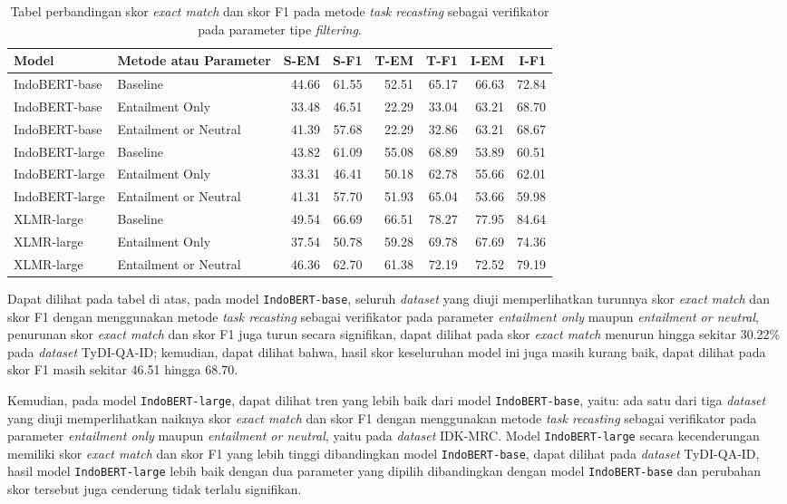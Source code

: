 \begin{table}[H]\centering
\small
\begin{tabular}{llrrrrrr}
\toprule
         Model &                Metode atau Parameter &  S-EM &  S-F1 &  T-EM &  T-F1 &  I-EM &  I-F1 \\
\midrule
 IndoBERT-base &              Baseline & 44.66 & 61.55 & 52.51 & 65.17 & 66.63 & 72.84 \\
 IndoBERT-base &       Entailment Only & 33.48 & 46.51 & 22.29 & 33.04 & 63.21 & 68.70 \\
 IndoBERT-base & Entailment or Neutral & 41.39 & 57.68 & 22.29 & 32.86 & 63.21 & 68.67 \\
\hline
IndoBERT-large &              Baseline & 43.82 & 61.09 & 55.08 & 68.89 & 53.89 & 60.51 \\
IndoBERT-large &       Entailment Only & 33.31 & 46.41 & 50.18 & 62.78 & 55.66 & 62.01 \\
IndoBERT-large & Entailment or Neutral & 41.31 & 57.70 & 51.93 & 65.04 & 53.66 & 59.98 \\
\hline
    XLMR-large &              Baseline & 49.54 & 66.69 & 66.51 & 78.27 & 77.95 & 84.64 \\
    XLMR-large &       Entailment Only & 37.54 & 50.78 & 59.28 & 69.78 & 67.69 & 74.36 \\
    XLMR-large & Entailment or Neutral & 46.36 & 62.70 & 61.38 & 72.19 & 72.52 & 79.19 \\
\bottomrule
\end{tabular}
\caption{Tabel perbandingan skor \emph{exact match} dan skor F1 pada metode \emph{task recasting} sebagai verifikator pada parameter tipe \emph{filtering}.}
\end{table}

Dapat dilihat pada tabel di atas, pada model \texttt{IndoBERT-base}, seluruh \emph{dataset} yang diuji memperlihatkan turunnya skor \emph{exact match} dan skor F1 dengan menggunakan metode \emph{task recasting} sebagai verifikator pada parameter \emph{entailment only} maupun \emph{entailment or neutral}, penurunan skor \emph{exact match} dan skor F1 juga turun secara signifikan, dapat dilihat pada skor \emph{exact match} menurun hingga sekitar 30.22\% pada \emph{dataset} TyDI-QA-ID; kemudian, dapat dilihat bahwa, hasil skor keseluruhan model ini juga masih kurang baik, dapat dilihat pada skor F1 masih sekitar 46.51 hingga 68.70.

Kemudian, pada model \texttt{IndoBERT-large}, dapat dilihat tren yang lebih baik dari model \texttt{IndoBERT-base}, yaitu: ada satu dari tiga \emph{dataset} yang diuji memperlihatkan naiknya skor \emph{exact match} dan skor F1 dengan menggunakan metode \emph{task recasting} sebagai verifikator pada parameter \emph{entailment only} maupun \emph{entailment or neutral}, yaitu pada \emph{dataset} IDK-MRC. Model \texttt{IndoBERT-large} secara kecenderungan memiliki skor \emph{exact match} dan skor F1 yang lebih tinggi dibandingkan model \texttt{IndoBERT-base}, dapat dilihat pada \emph{dataset} TyDI-QA-ID, hasil model \texttt{IndoBERT-large} lebih baik dengan dua parameter yang dipilih dibandingkan dengan model \texttt{IndoBERT-base} dan perubahan skor tersebut juga cenderung tidak terlalu signifikan.

